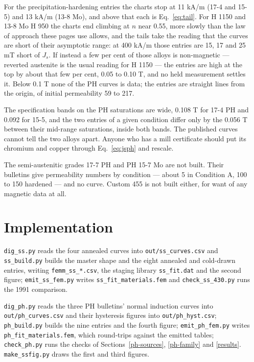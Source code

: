 \documentclass[
  11pt,
]{article}
\newcounter{none} %
\begin{document}
For the precipitation-hardening entries the charts stop at 11 kA/m (17-4 and 15-5) and 13 kA/m (13-8 Mo), and above that each is Eq.~\eqref{eq:tail}. For H 1150 and 13-8 Mo H 950 the charts end climbing at \(n\) near 0.55, more slowly than the law of approach these pages use allows, and the tails take the reading that the curves are short of their asymptotic range: at 400 kA/m those entries are 15, 17 and 25 mT short of \(J_s\). If instead a few per cent of those alloys is non-magnetic --- reverted austenite is the usual reading for H 1150 --- the entries are high at the top by about that few per cent, 0.05 to 0.10 T, and no held measurement settles it. Below 0.1 T none of the PH curves is data; the entries are straight lines from the origin, of initial permeability 59 to 217.

The specification bands on the PH saturations are wide, 0.108 T for 17-4 PH and 0.092 for 15-5, and the two entries of a given condition differ only by the 0.056 T between their mid-range saturations, inside both bands. The published curves cannot tell the two alloys apart. Anyone who has a mill certificate should put its chromium and copper through Eq.~\eqref{eq:jsph} and rescale.

The semi-austenitic grades 17-7 PH and PH 15-7 Mo are not built. Their bulletins \cite{clf-177,clf-157} give permeability numbers by condition --- about 5 in Condition A, 100 to 150 hardened --- and no curve. Custom 455 is not built either, for want of any magnetic data at all.

\section{Implementation}\label{implementation}

\texttt{dig\_ss.py} reads the four annealed curves into \texttt{out/ss\_curves.csv} and \texttt{ss\_build.py} builds the master shape and the eight annealed and cold-drawn entries, writing \texttt{femm\_ss\_*.csv}, the staging library \texttt{ss\_fit.dat} and the second figure; \texttt{emit\_ss\_fem.py} writes \texttt{ss\_fit\_materials.fem} and \texttt{check\_ss\_430.py} runs the 1991 comparison.

\texttt{dig\_ph.py} reads the three PH bulletins' normal induction curves into \texttt{out/ph\_curves.csv} and their hysteresis figures into \texttt{out/ph\_hyst.csv}; \texttt{ph\_build.py} builds the nine entries and the fourth figure; \texttt{emit\_ph\_fem.py} writes \texttt{ph\_fit\_materials.fem}, which round-trips against the emitted tables; \texttt{check\_ph.py} runs the checks of Sections~\ref{ph-sources}, \ref{ph-family} and \ref{results}. \texttt{make\_ssfig.py} draws the first and third figures.
\end{document}

